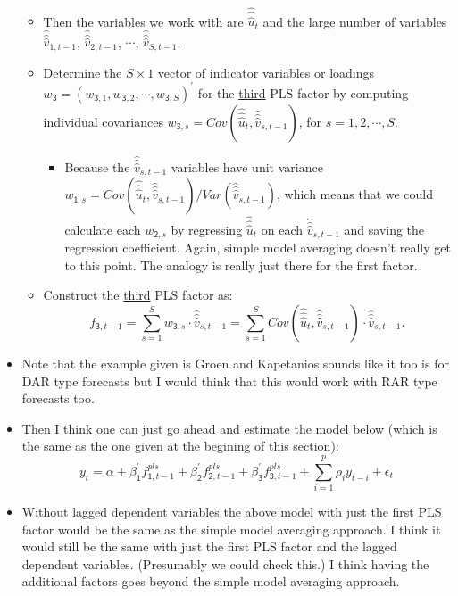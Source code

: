 \documentclass[11pt]{article}
\begin{document}
\begin{itemize}
\begin{itemize}
\begin{eqnarray}
\end{eqnarray}
\item Then the variables we work with are $\widehat{\widehat{\widehat{u}}}_{t}$ and the large number of variables $\widehat{\widehat{\widehat{v}}}_{1,t-1}$, $\widehat{\widehat{\widehat{v}}}_{2,t-1}$, $\cdots$, $\widehat{\widehat{\widehat{v}}}_{S,t-1}$.
\item Determine the $S\times1$ vector of indicator variables or loadings $w_{\mathsf{3}}=\left(w_{\mathsf{3},1}, w_{\mathsf{3},2},\cdots,w_{\mathsf{3},S}\right)^{\prime}$ for the \underline{third} PLS factor by computing individual covariances $w_{\mathsf{3},s}=Cov(\widehat{\widehat{\widehat{u}}}_{t},\widehat{\widehat{\widehat{v}}}_{s,t-1})$, for $s=1,2,\cdots,S$.
\begin{itemize}
\item Because the $\widehat{\widehat{\widehat{v}}}_{s,t-1}$ variables have unit variance $w_{\mathsf{1},s}=Cov(\widehat{\widehat{\widehat{u}}}_{t},\widehat{\widehat{\widehat{v}}}_{s,t-1})/Var(\widehat{\widehat{\widehat{v}}}_{s,t-1})$, which means that we could calculate each $w_{\mathsf{2},s}$ by regressing $\widehat{\widehat{\widehat{u}}}_{t}$ on each $\widehat{\widehat{\widehat{v}}}_{s,t-1}$ and saving the regression coefficient.  Again, simple model averaging doesn't really get to this point.  The analogy is really just there for the first factor.
\end{itemize}
\item Construct the \underline{third} PLS factor as:
\[ f_{\mathsf{3},t-1}=\sum_{s=1}^{S}w_{\mathsf{3},s}\cdot\widehat{\widehat{\widehat{v}}}_{s,t-1}=\sum_{s=1}^{S}Cov(\widehat{\widehat{\widehat{u}}}_{t},\widehat{\widehat{\widehat{v}}}_{s,t-1})\cdot\widehat{\widehat{\widehat{v}}}_{s,t-1}. \]
\end{itemize}
\item Note that the example given is Groen and Kapetanios sounds like it too is for DAR type forecasts but I would think that this would work with RAR type forecasts too.
\item Then I think one can just go ahead and estimate the model below (which is the same as the one given at the begining of this section):
\[ y_{t}=\alpha+\beta^{\prime}_{\mathsf{1}}f^{pls}_{\mathsf{1},t-1}+\beta^{\prime}_{\mathsf{2}}f^{pls}_{\mathsf{2},t-1}+\beta^{\prime}_{\mathsf{3}}f^{pls}_{\mathsf{3},t-1}+\sum_{i=1}^{p}\rho_{i}y_{t-i}+\epsilon_{t}\]
\item Without lagged dependent variables the above model with just the first PLS factor would be the same as the simple model averaging approach.  I think it would still be the same with just the first PLS factor and the lagged dependent variables.  (Presumably we could check this.)  I think having the additional factors goes beyond the simple model averaging approach.
\end{itemize}
\end{document}

